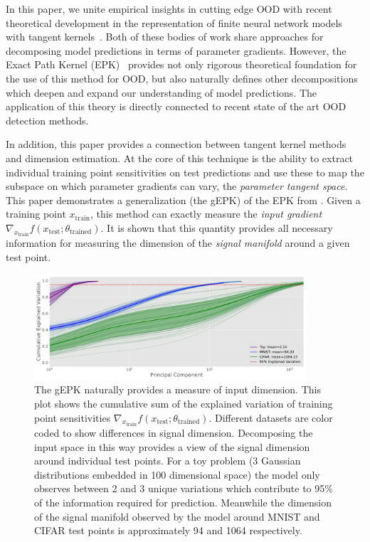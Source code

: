 In this paper, we unite empirical insights in cutting edge OOD with recent theoretical development in the representation of finite neural network models with tangent kernels~\citep{bell2023,chen2021equivalence,domingos2020}. 
Both of these bodies of work share approaches for decomposing model predictions in terms of parameter gradients. 
However, the Exact Path Kernel (EPK)~\citep{bell2023} provides not only rigorous theoretical foundation for the use of this method for OOD, but also naturally defines other decompositions which deepen and expand our understanding of model predictions. The application of this theory is directly connected to recent state of the art OOD detection methods.

In addition, this paper provides a connection between tangent kernel methods and dimension estimation. 
At the core of this technique is the ability to extract individual training point sensitivities on test predictions and use these to map the subspace on which parameter gradients can vary, the \emph{parameter tangent space}.
This paper demonstrates a generalization (the gEPK) of the EPK from
\citet{bell2023}. Given a training point $x_{\text{train}}$, this
method can exactly measure the \emph{input gradient} $\nabla_{x_\text{train}}f(x_\text{test}; \theta_\text{trained})$.
It is shown that this quantity provides all necessary information for measuring the dimension of the \textit{signal manifold} \citep{srinivas2023} around a given test point.

\begin{figure}[t]
    \centering
    \includegraphics[width=0.9\textwidth]{c4a_figures/dimensionality_chords.pdf}
    \caption{The gEPK naturally provides a measure of input dimension. This plot shows the cumulative sum of the explained variation of training point sensitivities $\nabla_{x_\text{train}}f(x_\text{test}; \theta_\text{trained})$. Different datasets are color coded to show differences in signal dimension. Decomposing the input space in this way provides a view of the signal dimension around individual test points. For a toy problem (3 Gaussian distributions embedded in 100 dimensional space) the model only observes between 2 and 3 unique variations which contribute to 95\% of the information required for prediction. Meanwhile the dimension of the signal manifold observed by the model around MNIST and CIFAR test points is approximately 94 and 1064 respectively. }
    \label{fig:cdf}
\end{figure}
 
